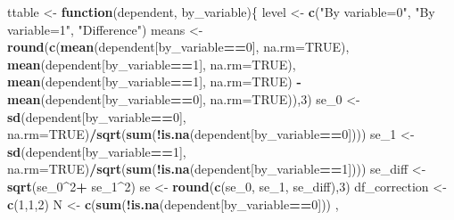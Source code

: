 \documentclass[
]{article}
\newenvironment{Shaded}{\begin{snugshade}}{\end{snugshade}}
\newcommand{\AttributeTok}[1]{\textcolor[rgb]{0.13,0.29,0.53}{#1}}
\newcommand{\ConstantTok}[1]{\textcolor[rgb]{0.56,0.35,0.01}{#1}}
\newcommand{\ControlFlowTok}[1]{\textcolor[rgb]{0.13,0.29,0.53}{\textbf{#1}}}
\newcommand{\DecValTok}[1]{\textcolor[rgb]{0.00,0.00,0.81}{#1}}
\newcommand{\FunctionTok}[1]{\textcolor[rgb]{0.13,0.29,0.53}{\textbf{#1}}}
\newcommand{\NormalTok}[1]{#1}
\newcommand{\OtherTok}[1]{\textcolor[rgb]{0.56,0.35,0.01}{#1}}
\newcommand{\SpecialCharTok}[1]{\textcolor[rgb]{0.81,0.36,0.00}{\textbf{#1}}}
\newcommand{\StringTok}[1]{\textcolor[rgb]{0.31,0.60,0.02}{#1}}
\begin{document}
\begin{Shaded}
\begin{Highlighting}[]
\NormalTok{  ttable }\OtherTok{\textless{}{-}} \ControlFlowTok{function}\NormalTok{(dependent, by\_variable)\{}
\NormalTok{  level }\OtherTok{\textless{}{-}} \FunctionTok{c}\NormalTok{(}\StringTok{"By variable=0"}\NormalTok{, }\StringTok{"By variable=1"}\NormalTok{, }\StringTok{"Difference"}\NormalTok{)}
\NormalTok{  means }\OtherTok{\textless{}{-}} \FunctionTok{round}\NormalTok{(}\FunctionTok{c}\NormalTok{(}\FunctionTok{mean}\NormalTok{(dependent[by\_variable}\SpecialCharTok{==}\DecValTok{0}\NormalTok{], }\AttributeTok{na.rm=}\ConstantTok{TRUE}\NormalTok{),}
  \FunctionTok{mean}\NormalTok{(dependent[by\_variable}\SpecialCharTok{==}\DecValTok{1}\NormalTok{], }\AttributeTok{na.rm=}\ConstantTok{TRUE}\NormalTok{),}
  \FunctionTok{mean}\NormalTok{(dependent[by\_variable}\SpecialCharTok{==}\DecValTok{1}\NormalTok{], }\AttributeTok{na.rm=}\ConstantTok{TRUE}\NormalTok{) }\SpecialCharTok{{-}}
  \FunctionTok{mean}\NormalTok{(dependent[by\_variable}\SpecialCharTok{==}\DecValTok{0}\NormalTok{], }\AttributeTok{na.rm=}\ConstantTok{TRUE}\NormalTok{)),}\DecValTok{3}\NormalTok{)}
\NormalTok{  se\_0 }\OtherTok{\textless{}{-}} \FunctionTok{sd}\NormalTok{(dependent[by\_variable}\SpecialCharTok{==}\DecValTok{0}\NormalTok{],}
  \AttributeTok{na.rm=}\ConstantTok{TRUE}\NormalTok{)}\SpecialCharTok{/}\FunctionTok{sqrt}\NormalTok{(}\FunctionTok{sum}\NormalTok{(}\SpecialCharTok{!}\FunctionTok{is.na}\NormalTok{(dependent[by\_variable}\SpecialCharTok{==}\DecValTok{0}\NormalTok{])))}
\NormalTok{  se\_1 }\OtherTok{\textless{}{-}} \FunctionTok{sd}\NormalTok{(dependent[by\_variable}\SpecialCharTok{==}\DecValTok{1}\NormalTok{],}
  \AttributeTok{na.rm=}\ConstantTok{TRUE}\NormalTok{)}\SpecialCharTok{/}\FunctionTok{sqrt}\NormalTok{(}\FunctionTok{sum}\NormalTok{(}\SpecialCharTok{!}\FunctionTok{is.na}\NormalTok{(dependent[by\_variable}\SpecialCharTok{==}\DecValTok{1}\NormalTok{])))}
\NormalTok{  se\_diff }\OtherTok{\textless{}{-}}\FunctionTok{sqrt}\NormalTok{(se\_0}\SpecialCharTok{\^{}}\DecValTok{2}\SpecialCharTok{+}\NormalTok{ se\_1}\SpecialCharTok{\^{}}\DecValTok{2}\NormalTok{)}
\NormalTok{  se }\OtherTok{\textless{}{-}} \FunctionTok{round}\NormalTok{(}\FunctionTok{c}\NormalTok{(se\_0, se\_1, se\_diff),}\DecValTok{3}\NormalTok{)}
\NormalTok{  df\_correction }\OtherTok{\textless{}{-}} \FunctionTok{c}\NormalTok{(}\DecValTok{1}\NormalTok{,}\DecValTok{1}\NormalTok{,}\DecValTok{2}\NormalTok{)}
\NormalTok{  N }\OtherTok{\textless{}{-}} \FunctionTok{c}\NormalTok{(}\FunctionTok{sum}\NormalTok{(}\SpecialCharTok{!}\FunctionTok{is.na}\NormalTok{(dependent[by\_variable}\SpecialCharTok{==}\DecValTok{0}\NormalTok{])) ,}

\end{Highlighting}
\end{Shaded}
\end{document}
